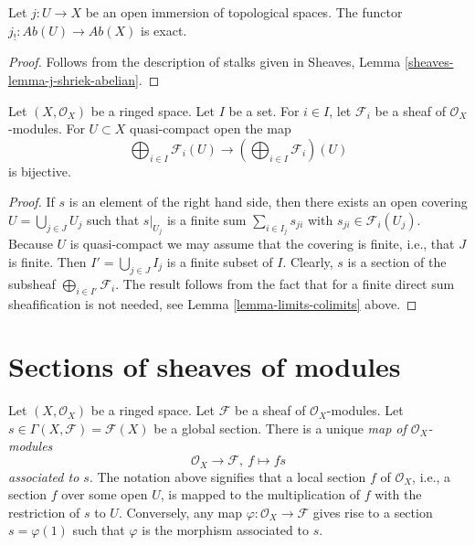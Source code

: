 \begin{lemma}
\label{lemma-j-shriek-exact}
Let $j : U \to X$ be an open immersion of topological spaces.
The functor $j_! : \textit{Ab}(U) \to \textit{Ab}(X)$
is exact.
\end{lemma}

\begin{proof}
Follows from the description of stalks
given in Sheaves, Lemma \ref{sheaves-lemma-j-shriek-abelian}.
\end{proof}

\begin{lemma}
\label{lemma-section-direct-sum-quasi-compact}
Let $(X, \mathcal{O}_X)$ be a ringed space.
Let $I$ be a set. For $i \in I$, let $\mathcal{F}_i$
be a sheaf of $\mathcal{O}_X$-modules.
For $U \subset X$ quasi-compact open the map
$$
\bigoplus\nolimits_{i \in I} \mathcal{F}_i(U)
\longrightarrow
\left(\bigoplus\nolimits_{i \in I} \mathcal{F}_i\right)(U)
$$
is bijective.
\end{lemma}

\begin{proof}
If $s$ is an element of the right hand side, then
there exists an open covering $U = \bigcup_{j \in J} U_j$
such that $s|_{U_j}$ is a finite sum
$\sum_{i \in I_j} s_{ji}$ with $s_{ji} \in \mathcal{F}_i(U_j)$.
Because $U$ is quasi-compact we may assume that the
covering is finite, i.e., that $J$ is finite.
Then $I' = \bigcup_{j \in J} I_j$ is a finite subset of
$I$. Clearly, $s$ is a section of the subsheaf
$\bigoplus_{i \in I'} \mathcal{F}_i$. The result follows
from the fact that for a finite direct sum sheafification
is not needed, see Lemma \ref{lemma-limits-colimits} above.
\end{proof}



\section{Sections of sheaves of modules}
\label{section-sections}

\noindent
Let $(X, \mathcal{O}_X)$ be a ringed space.
Let $\mathcal{F}$ be a sheaf of $\mathcal{O}_X$-modules.
Let $s \in \Gamma(X, \mathcal{F}) = \mathcal{F}(X)$ be a
global section. There is a unique {\it map of $\mathcal{O}_X$-modules}
$$
\mathcal{O}_X \longrightarrow \mathcal{F}, \ f \longmapsto fs
$$
{\it associated to $s$}. The notation above signifies that a local
section $f$ of $\mathcal{O}_X$, i.e., a section $f$ over some open $U$,
is mapped to the multiplication of $f$ with the restriction of $s$ to
$U$. Conversely, any map $\varphi : \mathcal{O}_X \to \mathcal{F}$
gives rise to a section $s = \varphi(1)$ such that $\varphi$ is
the morphism associated to $s$.

